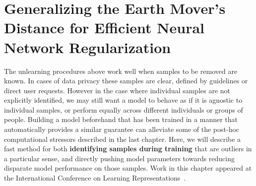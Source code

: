\chapter{Generalizing the Earth Mover's Distance for Efficient Neural Network Regularization}\label{chap:demd}
The unlearning procedures above work well
when samples to be removed are known.
In cases of data privacy these samples are clear,
defined by guidelines or direct user requests.
However in the case where individual
samples are not explicitly identified,
we may still want a model to behave as if
it is agnostic to individual samples,
or perform equally across different individuals
or groups of people. Building a model
beforehand that has been trained in a manner
that automatically provides a similar guarantee
can alleviate some of the post-hoc
computational stressors described in the last chapter.
Here, we will describe a fast method
for both \textbf{identifying samples during training}
that are outliers in a particular sense,
and directly pushing model parameters
towards reducing disparate model performance
on those samples.
Work in this chapter appeared at the International
Conference on Learning Representations~\citep{demd}.






